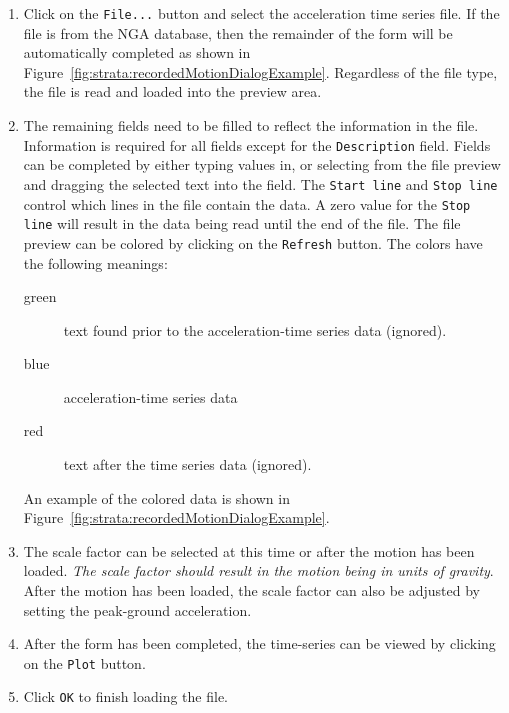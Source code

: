 \documentclass[12pt,oneside]{book}
\begin{document}
\begin{enumerate}
    \item Click on the \texttt{File...} button and select the acceleration time series file.  If the
        file is from the NGA database, then the remainder of the form will be automatically completed as
        shown in Figure~\ref{fig:strata:recordedMotionDialogExample}.  Regardless of the file type, the
        file is read and loaded into the preview area.
    \item The remaining fields need to be filled to reflect the information in the file.  Information is
        required for all fields except for the \texttt{Description} field.  Fields can be
        completed by either typing values in, or selecting from the file preview and dragging the selected
        text into the field. The \texttt{Start line} and \texttt{Stop line} control which lines in the file
        contain the data.  A zero value for the \texttt{Stop line} will result in the data being read until
        the end of the file.  The file preview can be colored by clicking on the \texttt{Refresh} button.
        The colors have the following meanings:
        \begin{description}
            \item[green] text found prior to the acceleration-time series data (ignored).
            \item[blue] acceleration-time series data
            \item[red] text after the time series data (ignored).
        \end{description}
        An example of the colored data is shown in Figure~\ref{fig:strata:recordedMotionDialogExample}.
    \item The scale factor can be selected at this time or after the motion has been loaded.  \emph{The scale
        factor should result in the motion being in units of gravity}.  After the motion has been loaded,
        the scale factor can also be adjusted by setting the peak-ground acceleration.
    \item After the form has been completed, the time-series can be viewed by clicking on the
        \texttt{Plot} button.
    \item Click \texttt{OK} to finish loading the file.
\end{enumerate} 
\end{document}
